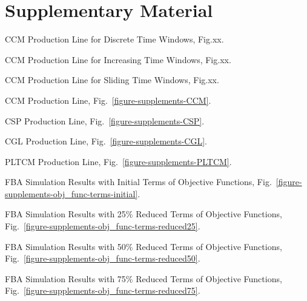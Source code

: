 \chapter{Supplementary Material}
\begin{itemize}
	{\color{red}
	\item CCM Production Line for Discrete Time Windows, Fig.xx.
	\item CCM Production Line for Increasing Time Windows, Fig.xx.
	\item CCM Production Line for Sliding Time Windows, Fig.xx.}
	\item CCM Production Line, Fig.~\ref{figure-supplements-CCM}.
	\item CSP Production Line, Fig.~\ref{figure-supplements-CSP}.
	\item CGL Production Line, Fig.~\ref{figure-supplements-CGL}.
	\item PLTCM Production Line, Fig.~\ref{figure-supplements-PLTCM}.
	
	\item FBA Simulation Results with Initial Terms of Objective Functions, Fig.~\ref{figure-supplements-obj_func-terms-initial}.
	\item FBA Simulation Results with 25\% Reduced Terms of Objective Functions, Fig.~\ref{figure-supplements-obj_func-terms-reduced25}.
	\item FBA Simulation Results with 50\% Reduced Terms of Objective Functions, Fig.~\ref{figure-supplements-obj_func-terms-reduced50}.
	\item FBA Simulation Results with 75\% Reduced Terms of Objective Functions, Fig.~\ref{figure-supplements-obj_func-terms-reduced75}.
\end{itemize}
\clearpage

\beginsupplement










